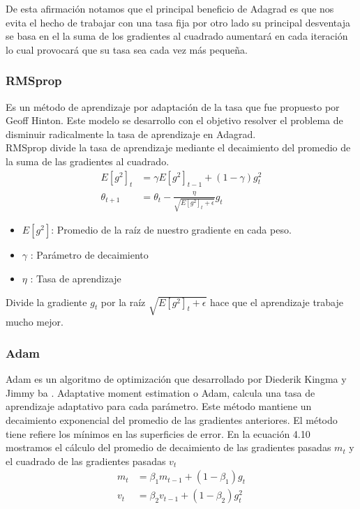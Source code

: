 De esta afirmación notamos que el principal beneficio de Adagrad es que nos evita el hecho de trabajar con una tasa fija por otro lado su principal desventaja se basa en el la suma de los gradientes al cuadrado aumentará en cada iteración lo cual provocará que su tasa sea cada vez más pequeña.


\subsubsection{RMSprop}
Es un método de aprendizaje por adaptación de la tasa que fue propuesto por Geoff Hinton.
Este modelo se desarrollo con el objetivo resolver el problema de disminuir radicalmente la tasa de aprendizaje en Adagrad.\\ RMSprop divide la tasa de aprendizaje mediante el decaimiento del promedio de la suma de las gradientes al cuadrado.
\begin{equation}
\label{RMS}
\begin{aligned}
E[g^2]_{t} &= \gamma E[g^2]_{t-1} + (1-\gamma)g^{2}_{t}\\
\theta_{t+1} &= \theta_{t} - \frac{\eta}{\sqrt{E[g^2]_{t} +\epsilon }} g_{t}
\end{aligned}
\end{equation}
\begin{itemize}
	\item $E[g^2]$: Promedio de la raíz de nuestro gradiente en cada peso.
	\item $\gamma$  : Parámetro de decaimiento
	\item $\eta$    : Tasa de aprendizaje
\end{itemize}
Divide la gradiente $g_{t}$ por la raíz $\sqrt{E[g^2]_{t} +\epsilon}$ hace que el aprendizaje trabaje mucho mejor.
\subsubsection{Adam	}
Adam es un algoritmo de optimización que desarrollado por Diederik Kingma y Jimmy ba\cite{ADAM} .
Adaptative moment estimation  o Adam, calcula una tasa de aprendizaje adaptativo para cada parámetro. Este método mantiene un decaimiento exponencial del promedio de las gradientes anteriores. El método tiene refiere los mínimos en las superficies de error.
 En la ecuación 4.10 mostramos el cálculo del promedio de decaimiento de las gradientes pasadas $m_{t}$ y el cuadrado de las gradientes pasadas $v_{t}$
\begin{equation}
\label{adam1}
\begin{aligned}
m_{t} &= \beta_{1} m_{t-1} +(1-\beta_{1})g_{t} \\
v_{t} &= \beta_{2} v_{t-1} +(1-\beta_{2})g_{t}^2
\end{aligned}
\end{equation}

